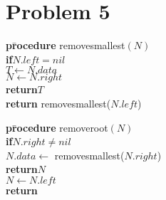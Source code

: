 \documentclass[letter]{article}
\newcommand{\aprocedure}{\textbf{pr}\=\+\textbf{ocedure}\xspace}
\newcommand{\aif}{\textbf{if}\=\+\xspace}
\newcommand{\aend}{\-\kill}
\newcommand{\areturn}{\textbf{return}\xspace}
\begin{document}
\section*{Problem 5}

\begin{tabbing}
\aprocedure removesmallest$(N)$\\
\aif $N.left = nil$\\
$T\gets N.data$\\
$N\gets N.right$\\
\areturn $T$\\
\aend
\areturn removesmallest($N.left$)\\
\aend
\end{tabbing}

\begin{tabbing}
\aprocedure removeroot$(N)$\\
\aif $N.right \neq nil$\\
$N.data \gets$ removesmallest($N.right$)\\
\areturn$ N$\\
\aend
$N \gets N.left$\\
\areturn
\aend
\end{tabbing}
\end{document}
